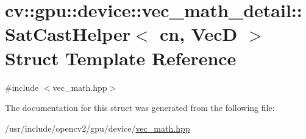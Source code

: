 \hypertarget{structcv_1_1gpu_1_1device_1_1vec__math__detail_1_1SatCastHelper}{\section{cv\-:\-:gpu\-:\-:device\-:\-:vec\-\_\-math\-\_\-detail\-:\-:Sat\-Cast\-Helper$<$ cn, Vec\-D $>$ Struct Template Reference}
\label{structcv_1_1gpu_1_1device_1_1vec__math__detail_1_1SatCastHelper}
}


{\ttfamily \#include $<$vec\-\_\-math.\-hpp$>$}



The documentation for this struct was generated from the following file\-:\begin{DoxyCompactItemize}
\item 
/usr/include/opencv2/gpu/device/\hyperlink{vec__math_8hpp}{vec\-\_\-math.\-hpp}\end{DoxyCompactItemize}
